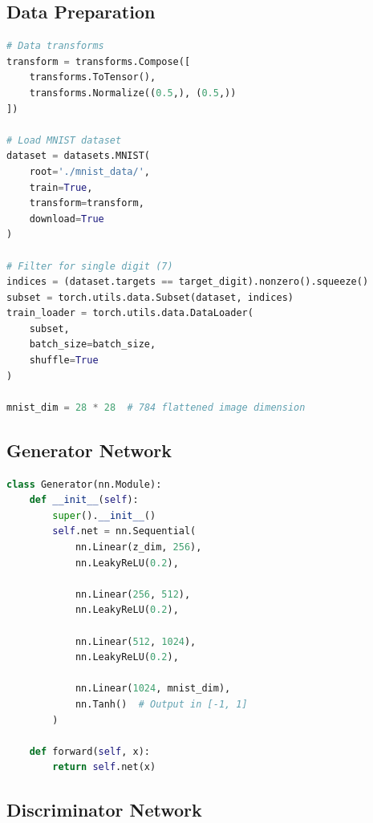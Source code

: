 \documentclass[12pt,a4paper]{article}
\begin{document}
\subsection{Data Preparation}

\begin{lstlisting}[language=Python, caption=MNIST data loading and preprocessing]
# Data transforms
transform = transforms.Compose([
    transforms.ToTensor(),
    transforms.Normalize((0.5,), (0.5,))
])

# Load MNIST dataset
dataset = datasets.MNIST(
    root='./mnist_data/', 
    train=True, 
    transform=transform, 
    download=True
)

# Filter for single digit (7)
indices = (dataset.targets == target_digit).nonzero().squeeze()
subset = torch.utils.data.Subset(dataset, indices)
train_loader = torch.utils.data.DataLoader(
    subset, 
    batch_size=batch_size, 
    shuffle=True
)

mnist_dim = 28 * 28  # 784 flattened image dimension
\end{lstlisting}

\subsection{Generator Network}

\begin{lstlisting}[language=Python, caption=Generator Network Implementation]
class Generator(nn.Module):
    def __init__(self):
        super().__init__()
        self.net = nn.Sequential(
            nn.Linear(z_dim, 256),
            nn.LeakyReLU(0.2),
            
            nn.Linear(256, 512),
            nn.LeakyReLU(0.2),
            
            nn.Linear(512, 1024),
            nn.LeakyReLU(0.2),
            
            nn.Linear(1024, mnist_dim),
            nn.Tanh()  # Output in [-1, 1]
        )
    
    def forward(self, x):
        return self.net(x)
\end{lstlisting}

\subsection{Discriminator Network}
\end{document}
